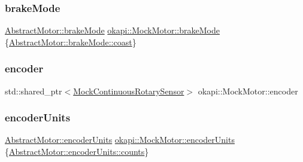 \subsubsection{\texorpdfstring{brakeMode}{brakeMode}}
{\footnotesize\ttfamily \mbox{\hyperlink{classokapi_1_1AbstractMotor_a132e0485dbb59a60c3f934338d8fa601}{Abstract\+Motor\+::brake\+Mode}} \mbox{\hyperlink{classokapi_1_1AbstractMotor_a132e0485dbb59a60c3f934338d8fa601}{okapi\+::\+Mock\+Motor\+::brake\+Mode}} \{\mbox{\hyperlink{classokapi_1_1AbstractMotor_a132e0485dbb59a60c3f934338d8fa601a756d153ba898e1be8218d4651009e981}{Abstract\+Motor\+::brake\+Mode\+::coast}}\}}

\mbox{\label{classokapi_1_1MockMotor_ac23216fd541e5ea5b59f096ba8c8f6c4}} 
\subsubsection{\texorpdfstring{encoder}{encoder}}
{\footnotesize\ttfamily std\+::shared\+\_\+ptr$<$\mbox{\hyperlink{classokapi_1_1MockContinuousRotarySensor}{Mock\+Continuous\+Rotary\+Sensor}}$>$ okapi\+::\+Mock\+Motor\+::encoder}

\mbox{\label{classokapi_1_1MockMotor_a5f14fb5824d9cf3bbdb198ee5dda039d}} 
\subsubsection{\texorpdfstring{encoderUnits}{encoderUnits}}
{\footnotesize\ttfamily \mbox{\hyperlink{classokapi_1_1AbstractMotor_ae811cd825099f2defadeb1b7f7e7764c}{Abstract\+Motor\+::encoder\+Units}} \mbox{\hyperlink{classokapi_1_1AbstractMotor_ae811cd825099f2defadeb1b7f7e7764c}{okapi\+::\+Mock\+Motor\+::encoder\+Units}} \{\mbox{\hyperlink{classokapi_1_1AbstractMotor_ae811cd825099f2defadeb1b7f7e7764ca0700cd3e2cd8b37ef510dd5aa2c81fc6}{Abstract\+Motor\+::encoder\+Units\+::counts}}\}}

\mbox{\label{classokapi_1_1MockMotor_ace0f87238f30c86dbac3454b3034a968}} 
